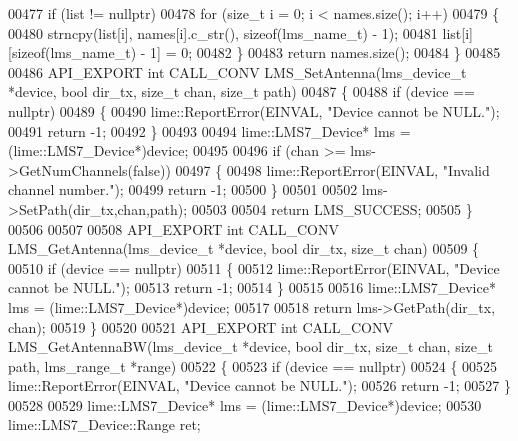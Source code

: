 \begin{DoxyCode}
00477     \textcolor{keywordflow}{if} (list != \textcolor{keyword}{nullptr})
00478         \textcolor{keywordflow}{for} (\textcolor{keywordtype}{size\_t} i = 0; i < names.size(); i++)
00479         \{
00480             strncpy(list[i], names[i].c\_str(), \textcolor{keyword}{sizeof}(lms_name_t) - 1);
00481             list[i][\textcolor{keyword}{sizeof}(lms_name_t) - 1] = 0;
00482         \}
00483     \textcolor{keywordflow}{return} names.size();
00484 \}
00485 
00486 API_EXPORT \textcolor{keywordtype}{int} CALL_CONV LMS_SetAntenna(lms_device_t *device, \textcolor{keywordtype}{bool} dir_tx, \textcolor{keywordtype}{size\_t} 
      chan, \textcolor{keywordtype}{size\_t} path)
00487 \{
00488     \textcolor{keywordflow}{if} (device == \textcolor{keyword}{nullptr})
00489     \{
00490         lime::ReportError(EINVAL, \textcolor{stringliteral}{"Device cannot be NULL."});
00491         \textcolor{keywordflow}{return} -1;
00492     \}
00493 
00494     lime::LMS7_Device* lms = (lime::LMS7_Device*)device;
00495 
00496     \textcolor{keywordflow}{if} (chan >= lms->GetNumChannels(\textcolor{keyword}{false}))
00497     \{
00498         lime::ReportError(EINVAL, \textcolor{stringliteral}{"Invalid channel number."});
00499         \textcolor{keywordflow}{return} -1;
00500     \}
00501 
00502     lms->SetPath(dir\_tx,chan,path);
00503 
00504     \textcolor{keywordflow}{return} LMS_SUCCESS;
00505 \}
00506 
00507 
00508 API_EXPORT \textcolor{keywordtype}{int} CALL_CONV LMS_GetAntenna(lms_device_t *device, \textcolor{keywordtype}{bool} dir_tx, \textcolor{keywordtype}{size\_t} 
      chan)
00509 \{
00510     \textcolor{keywordflow}{if} (device == \textcolor{keyword}{nullptr})
00511     \{
00512         lime::ReportError(EINVAL, \textcolor{stringliteral}{"Device cannot be NULL."});
00513         \textcolor{keywordflow}{return} -1;
00514     \}
00515 
00516     lime::LMS7_Device* lms = (lime::LMS7_Device*)device;
00517 
00518     \textcolor{keywordflow}{return} lms->GetPath(dir\_tx, chan);
00519 \}
00520 
00521 API_EXPORT \textcolor{keywordtype}{int} CALL_CONV LMS_GetAntennaBW(lms_device_t *device, \textcolor{keywordtype}{bool} dir_tx, \textcolor{keywordtype}{size\_t} 
      chan, \textcolor{keywordtype}{size\_t} path, lms_range_t *range)
00522 \{
00523     \textcolor{keywordflow}{if} (device == \textcolor{keyword}{nullptr})
00524     \{
00525         lime::ReportError(EINVAL, \textcolor{stringliteral}{"Device cannot be NULL."});
00526         \textcolor{keywordflow}{return} -1;
00527     \}
00528 
00529     lime::LMS7_Device* lms = (lime::LMS7_Device*)device;
00530     lime::LMS7_Device::Range ret;

\end{DoxyCode}
